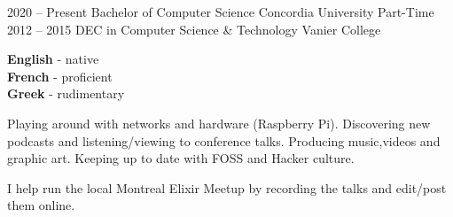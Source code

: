 \documentclass[9pt]{developercv} %
\begin{document}


\begin{entrylist}
	\entry
		{2020 -- Present}
		{Bachelor of Computer Science}
		{Concordia University}
		{Part-Time}
	\entry
		{2012 -- 2015}
		{DEC in Computer Science \& Technology}
		{Vanier College}
		{}
\end{entrylist}


\begin{minipage}[t]{0.2\textwidth}
	\vspace{-\baselineskip} %

	
	\textbf{English} - native\\
	\textbf{French} - proficient\\
	\textbf{Greek} - rudimentary
\end{minipage}
\hfill
\begin{minipage}[t]{0.4\textwidth}
	\vspace{-\baselineskip} %
	
	
    Playing around with networks and hardware (Raspberry Pi).
  Discovering new podcasts and listening/viewing to conference talks.
  Producing music,videos and graphic art.
  Keeping up to date with FOSS and Hacker culture.
\end{minipage}
\hfill
\begin{minipage}[t]{0.3\textwidth}
	\vspace{-\baselineskip} %
	
	
	I help run the local Montreal Elixir Meetup by recording the talks and edit/post them online.
\end{minipage}

\end{document}
